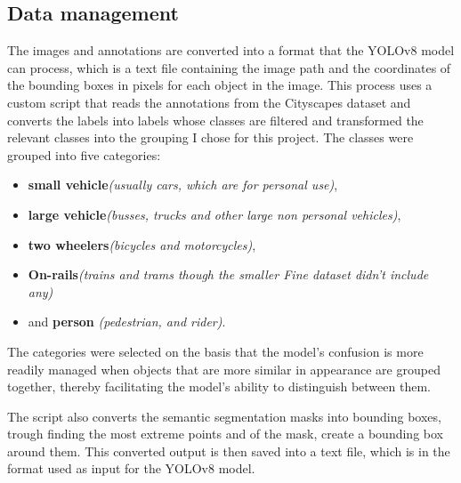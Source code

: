 \subsection{Data management} \label{subsec:data-management}
The images and annotations are converted into a format that the YOLOv8 model can process, which is
a text file containing the image path and the coordinates of the bounding boxes in pixels for each object in the image.
This process uses a custom script that reads the annotations from the Cityscapes dataset and converts the labels
into labels whose classes are filtered and transformed the relevant classes into the grouping I chose for this project.
The classes were grouped into five categories:
\begin{itemize}
    \item \textbf{small vehicle}\textit{(usually cars, which are for personal use)},
    \item \textbf{large vehicle}\textit{(busses, trucks and other large non personal vehicles)},
    \item \textbf{two wheelers}\textit{(bicycles and motorcycles)},
    \item \textbf{On-rails}\textit{(trains and trams though the smaller Fine dataset didn't include any)}
    \item and \textbf{person} \textit{(pedestrian, and rider)}.
\end{itemize}

The categories were selected on the basis that the model's confusion is more readily managed when objects
that are more similar in appearance are grouped together, thereby facilitating the model's ability to
distinguish between them.

The script also converts the semantic segmentation masks into bounding boxes, trough finding the most
extreme points and of the mask, create a bounding box around them.
This converted output is then saved into a text file, which is in the format used as input for the YOLOv8 model.

